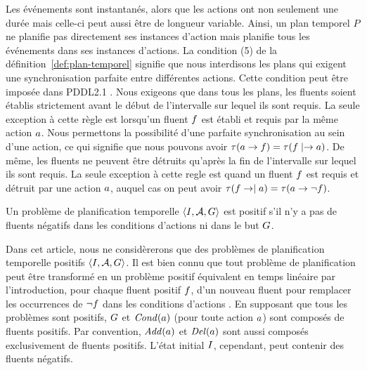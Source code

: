 Les événements sont instantanés, alors que les actions ont non seulement une durée mais celle-ci peut aussi être de longueur variable. Ainsi, un plan temporel $P$ ne planifie pas directement ses instances d'action mais planifie tous les événements dans ses instances d'actions.
La condition (5) de la définition~\ref{def:plan-temporel} signifie que nous interdisons les plans qui exigent une synchronisation parfaite entre différentes actions. %
Cette condition peut être imposée dans PDDL2.1 \cite{DBLP:conf/ecai/FoxLH04}. Nous exigeons que dans tous les plans, les fluents soient établis strictement avant le début de l'intervalle sur lequel ils sont requis. La seule exception à cette règle est lorsqu'un fluent $f$ est établi et requis par la même action $a$. Nous permettons la possibilité d'une parfaite synchronisation au sein d'une action, ce qui signifie que nous pouvons avoir $\tau(a\rightarrow f)=\tau(f\mid\rightarrow a)$.
De même, les fluents ne peuvent être détruits qu'après la fin de l'intervalle sur lequel ils sont requis. La seule exception à cette regle est quand un fluent $f$ est requis et détruit par une action $a$, auquel cas on peut avoir $\tau(f\rightarrow\mid a)=\tau(a\rightarrow\neg f)$. %

\begin{definition}
Un problème de planification temporelle $\langle I, \mathcal{A}, G \rangle$ est positif s'il n'y a pas de fluents négatifs dans les conditions d'actions ni dans le but $G$.
\end{definition}

Dans cet article, nous ne considèrerons que des problèmes de planification temporelle positifs $\langle I, \mathcal{A}, G \rangle$. Il est bien connu que tout problème de planification peut être transformé en un problème positif équivalent en temps linéaire par l'introduction, pour chaque fluent positif $f$, d'un nouveau fluent pour remplacer les occurrences de $\neg f$ dans les conditions d'actions \cite{DBLP:books/daglib/0014222}. %
En supposant que tous les problèmes sont positifs, $G$ et $\mathit{Cond}(a)$ (pour toute action $a$) sont composés de fluents positifs. Par convention, $\mathit{Add}(a)$ et $\mathit{Del}(a)$ sont aussi composés exclusivement de fluents positifs. L'état initial $I$, cependant, peut contenir des fluents négatifs.


